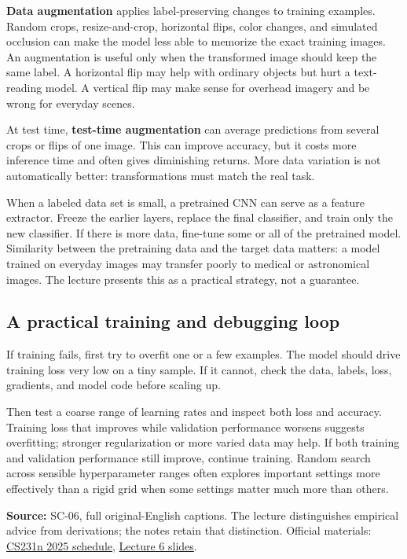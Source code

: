 \textbf{Data augmentation} applies label-preserving changes to training examples. Random crops, resize-and-crop, horizontal flips, color changes, and simulated occlusion can make the model less able to memorize the exact training images. An augmentation is useful only when the transformed image should keep the same label. A horizontal flip may help with ordinary objects but hurt a text-reading model. A vertical flip may make sense for overhead imagery and be wrong for everyday scenes.

At test time, \textbf{test-time augmentation} can average predictions from several crops or flips of one image. This can improve accuracy, but it costs more inference time and often gives diminishing returns. More data variation is not automatically better: transformations must match the real task.

When a labeled data set is small, a pretrained CNN can serve as a feature extractor. Freeze the earlier layers, replace the final classifier, and train only the new classifier. If there is more data, fine-tune some or all of the pretrained model. Similarity between the pretraining data and the target data matters: a model trained on everyday images may transfer poorly to medical or astronomical images. The lecture presents this as a practical strategy, not a guarantee.

\subsection{A practical training and debugging loop}\label{04-visual-computing-ii-ch031-a-practical-training-and-debugging-loop}

If training fails, first try to overfit one or a few examples. The model should drive training loss very low on a tiny sample. If it cannot, check the data, labels, loss, gradients, and model code before scaling up.

Then test a coarse range of learning rates and inspect both loss and accuracy. Training loss that improves while validation performance worsens suggests overfitting; stronger regularization or more varied data may help. If both training and validation performance still improve, continue training. Random search across sensible hyperparameter ranges often explores important settings more effectively than a rigid grid when some settings matter much more than others.

\textbf{Source:} SC-06, full original-English captions. The lecture distinguishes empirical advice from derivations; the notes retain that distinction. Official materials: \href{https://cs231n.stanford.edu/2025/schedule.html}{CS231n 2025 schedule}, \href{https://cs231n.stanford.edu/slides/2025/lecture_6.pdf}{Lecture 6 slides}.

